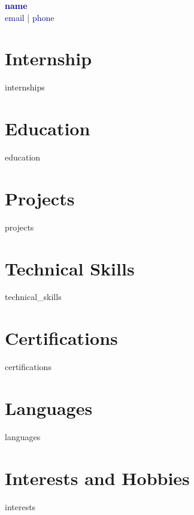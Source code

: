 \documentclass[11pt]{article}
\begin{document}
\begin{center}
    {\huge \textbf{\textcolor{darkblue}{{{ name }}}}} \\
    \vspace{5pt}
    \textcolor{darkblue}{{{ email }}} | \textcolor{darkblue}{{{ phone }}} \\
\end{center}

\vspace{10pt}

\section*{Internship}
{{ internships }}

\section*{Education}
{{ education }}

\section*{Projects}
\begin{itemize}
{{ projects }}
\end{itemize}

\section*{Technical Skills}
\begin{itemize}
{{ technical_skills }}
\end{itemize}

\section*{Certifications}
\begin{itemize}
{{ certifications }}
\end{itemize}

\section*{Languages}
\begin{itemize}
{{ languages }}
\end{itemize}

\section*{Interests and Hobbies}
\begin{itemize}
{{ interests }}
\end{itemize}
\end{document}
